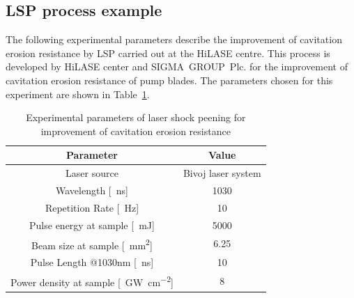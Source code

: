 \subsection{LSP process example}

The following experimental parameters describe the improvement of cavitation erosion resistance by LSP carried out at the HiLASE centre. This process is developed by HiLASE center and SIGMA~GROUP~Plc. for the improvement of cavitation erosion resistance of pump blades. The parameters chosen for this experiment are shown in Table~\ref{experimentalparameters}. 

\begin{table}[H]
\centering
    \begin{threeparttable}
        \begin{tabular}{|c | c|} 
        \hline
            \textbf{Parameter} & \textbf{Value} \\ [0.5ex] 
        \hline
        Laser source & Bivoj laser system  \\
        \hline
        Wavelength [\SI{}{\nano\second}] & 1030 \\
        \hline
        Repetition Rate [\SI{}{\hertz}] & 10  \\ 
        \hline
            Pulse energy at sample [\SI{}{\milli\joule}] & 5000 \\
        \hline
            Beam size at sample [\SI{}{\mm\squared}] & 6.25 \\
        \hline
            Pulse Length @1030nm [\SI{}{\nano\second}] & 10 \\
        \hline
            Power density at sample [\SI{}{\giga\watt\per\cm\squared}] & 8 \\

        \hline
        \end{tabular}

        \caption[Experimental parameters of laser shock peening]{Experimental parameters of laser shock peening for improvement of cavitation erosion resistance}
        \label{experimentalparameters}
    \end{threeparttable}
\end{table}

